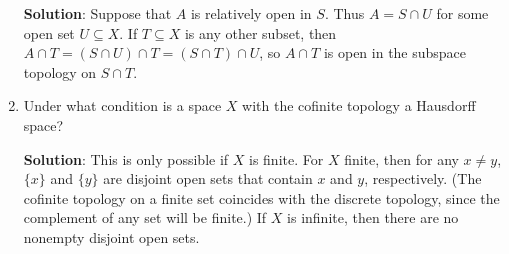\documentclass[letterpaper,12pt]{article}
\begin{document}
\begin{enumerate}
\bigskip

{\bf Solution}: Suppose that $A$ is relatively open in $S$. Thus $A=S\cap U$ for some open set $U\subseteq X$. If $T\subseteq X$ is any other subset, then $A\cap T = (S\cap U)\cap T = (S\cap T)\cap U$, so $A\cap T$ is open in the subspace topology on $S\cap T$.

\item Under what condition is a space $X$ with the cofinite topology a Hausdorff space?

\bigskip

{\bf Solution}: This is only possible if $X$ is finite. For $X$ finite, then for any $x\neq y$, $\{x\}$ and $\{y\}$ are disjoint open sets that contain $x$ and $y$, respectively. (The cofinite topology on a finite set coincides with the discrete topology, since the complement of any set will be finite.) If $X$ is infinite, then there are no nonempty disjoint open sets.

\end{enumerate}
\end{document}
